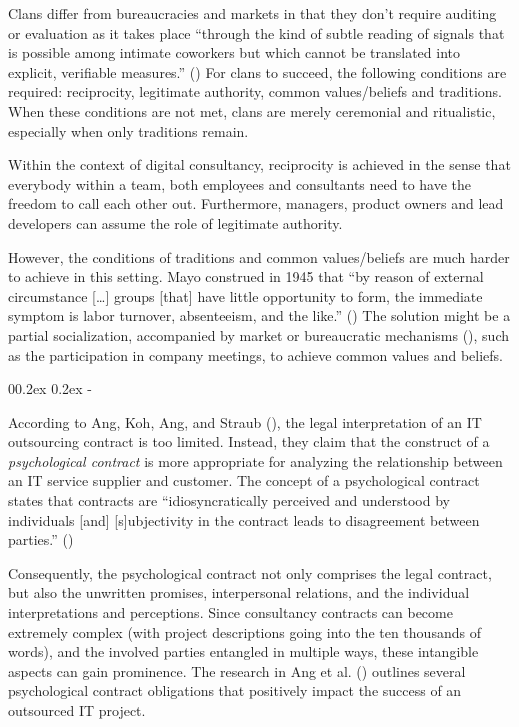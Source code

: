 \documentclass[
  man,floatsintext]{apa6}
\makeatletter
\let\oldsubparagraph\subparagraph
\renewcommand{\subparagraph}[1]{\oldsubparagraph{#1}\mbox{}}
\renewcommand{\subparagraph}[1]{\@startsection{subparagraph}{5}{1em}%
  {0\baselineskip \@plus 0.2ex \@minus 0.2ex}%
  {-\z@\relax}%
  {\normalfont\normalsize\itshape\hspace{\parindent}{#1}\textit{\addperi}}{\relax}}
\makeatother
\begin{document}
Clans differ from bureaucracies and markets in that they don't require auditing or evaluation as it takes place ``through the kind of subtle reading of signals that is possible among intimate coworkers but which cannot be translated into explicit, verifiable measures.'' () For clans to succeed, the following conditions are required: reciprocity, legitimate authority, common values/beliefs and traditions. When these conditions are not met, clans are merely ceremonial and ritualistic, especially when only traditions remain.

Within the context of digital consultancy, reciprocity is achieved in the sense that everybody within a team, both employees and consultants need to have the freedom to call each other out. Furthermore, managers, product owners and lead developers can assume the role of legitimate authority.

However, the conditions of traditions and common values/beliefs are much harder to achieve in this setting. Mayo construed in 1945 that ``by reason of external circumstance {[}\ldots{]} groups {[}that{]} have little opportunity to form, the immediate symptom is labor turnover, absenteeism, and the like.'' () The solution might be a partial socialization, accompanied by market or bureaucratic mechanisms (), such as the participation in company meetings, to achieve common values and beliefs.

\subparagraph{Psychological contract obligations}\label{psychological-contract-obligations}

According to Ang, Koh, Ang, and Straub (), the legal interpretation of an IT outsourcing contract is too limited. Instead, they claim that the construct of a \emph{psychological contract} is more appropriate for analyzing the relationship between an IT service supplier and customer. The concept of a psychological contract states that contracts are ``idiosyncratically perceived and understood by individuals {[}and{]} {[}s{]}ubjectivity in the contract leads to disagreement between parties.'' ()

Consequently, the psychological contract not only comprises the legal contract, but also the unwritten promises, interpersonal relations, and the individual interpretations and perceptions. Since consultancy contracts can become extremely complex (with project descriptions going into the ten thousands of words), and the involved parties entangled in multiple ways, these intangible aspects can gain prominence. The research in Ang et al. () outlines several psychological contract obligations that positively impact the success of an outsourced IT project.
\end{document}
